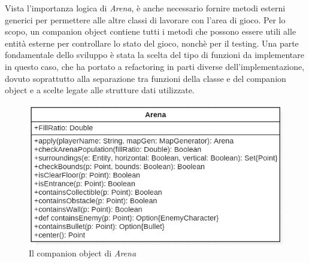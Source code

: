 Vista l'importanza logica di \textit{Arena}, è anche necessario fornire metodi esterni generici per permettere alle altre classi di lavorare con l'area di gioco. Per lo scopo, un companion object contiene tutti i metodi che possono essere utili alle entità esterne per controllare lo stato del gioco, nonchè per il testing. Una parte fondamentale dello sviluppo è stata la scelta del tipo di funzioni da implementare in questo caso, che ha portato a refactoring in parti diverse dell'implementazione, dovuto soprattutto alla separazione tra funzioni della classe e del companion object e a scelte legate alle strutture dati utilizzate.

\begin{figure}[H]
  \includegraphics[width=14cm]{res/arenaObject.png}
  \caption{Il companion object di \textit{Arena}}
  \label{arenaObject}
\end{figure}